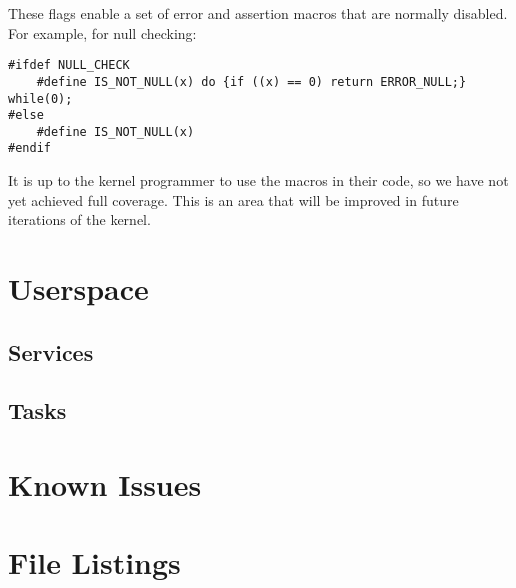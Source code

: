 \documentclass[twoside,a4paper]{refart}
\begin{document}
These flags enable a set of error and assertion macros that are normally disabled. For example, for null checking:

\begin{verbatim}
#ifdef NULL_CHECK
    #define IS_NOT_NULL(x) do {if ((x) == 0) return ERROR_NULL;} while(0);
#else
    #define IS_NOT_NULL(x)
#endif
\end{verbatim}

It is up to the kernel programmer to use the macros in their code, so we have not yet achieved full coverage. This is an area that will be improved in future iterations of the kernel.
\section{Userspace}
\subsection{Services}
\subsection{Tasks}

\section{Known Issues}
\section{File Listings}

\printindex
\end{document}
